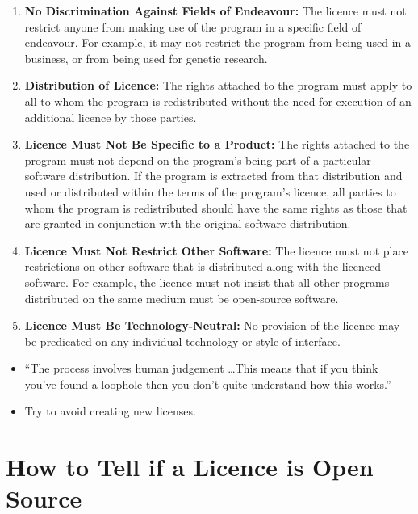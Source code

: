 \documentclass{article}
\begin{document}
\begin{enumerate}
\item {\bf No Discrimination Against Fields of Endeavour:}
The licence must not restrict anyone from making use of the program in a specific field of endeavour. For example, it may not restrict the program from being used in a business, or from being used for genetic research.


\item {\bf Distribution of Licence:}
The rights attached to the program must apply to all to whom the program is redistributed without the need for execution of an additional licence by those parties.

\item {\bf Licence Must Not Be Specific to a Product:}
The rights attached to the program must not depend on the program's being part of a particular software distribution. If the program is extracted from that distribution and used or distributed within the terms of the program's licence, all parties to whom the program is redistributed should have the same rights as those that are granted in conjunction with the original software distribution.

\item {\bf Licence Must Not Restrict Other Software:}
The licence must not place restrictions on other software that is distributed along with the licenced software. For example, the licence must not insist that all other programs distributed on the same medium must be open-source software.

\item {\bf Licence Must Be Technology-Neutral:}
No provision of the licence may be predicated on any individual technology or style of interface.
\end{enumerate}

\begin{itemize}
\item ``The process involves human judgement \ldots This means that if you think you've found a loophole then you don't quite understand how this works.''
\item Try to avoid creating new licenses.
\end{itemize}


\newpage
\section{How to Tell if a Licence is Open Source}
\end{document}
